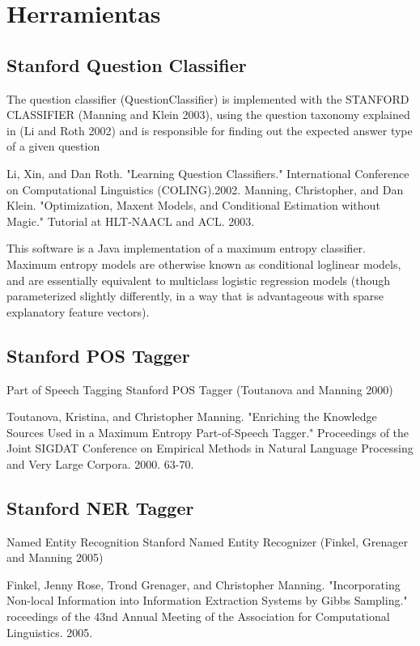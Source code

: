 \appendix
\chapter{Herramientas}

\section{Stanford Question Classifier}
The question classifier (QuestionClassifier) is implemented with the 
STANFORD CLASSIFIER (Manning and Klein 2003), using the question taxonomy 
explained in (Li and Roth 2002) and is responsible for finding out the expected 
answer type of a given question

Li, Xin, and Dan Roth. "Learning Question Classifiers." International Conference 
on Computational Linguistics (COLING).2002.
Manning, Christopher, and Dan Klein. "Optimization, Maxent Models, and 
Conditional Estimation without Magic." Tutorial at HLT-NAACL and ACL. 2003.

This software is a Java implementation of a maximum entropy classifier.
Maximum entropy models are otherwise known as conditional loglinear
models, and are essentially equivalent to multiclass logistic
regression models (though parameterized slightly differently, in a way
that is advantageous with sparse explanatory feature vectors). 

\section{Stanford POS Tagger}

Part of Speech Tagging Stanford POS Tagger (Toutanova and Manning 
2000)

Toutanova, Kristina, and Christopher Manning. "Enriching the Knowledge 
Sources Used in a Maximum Entropy Part-of-Speech Tagger." Proceedings of 
the Joint SIGDAT Conference on Empirical Methods in Natural Language 
Processing and Very Large Corpora. 2000. 63-70.


\section{Stanford NER Tagger}
\label{sec:stanford-ner}

Named Entity Recognition Stanford Named Entity Recognizer (Finkel, 
Grenager and Manning 2005) 

Finkel, Jenny Rose, Trond Grenager, and Christopher Manning. "Incorporating 
Non-local Information into Information Extraction Systems by Gibbs Sampling." 
roceedings of the 43nd Annual Meeting of the Association for Computational 
Linguistics. 2005. \cite{NER2}


